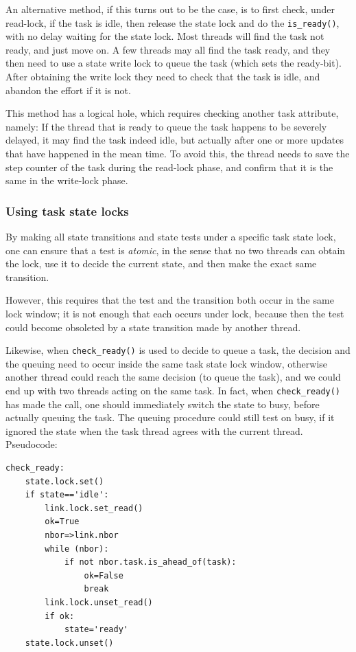 \documentclass[paper=a4,fontsize=11pt]{scrartcl}
\numberwithin{equation}{section}		%
\numberwithin{figure}{section}			%
\numberwithin{table}{section}				%
\newcommand{\codecolor}{\color{Blue}}
\newcommand{\Code}[1]{{\codecolor\texttt{#1}}}
\def\checkready{\Code{check\_ready()}}
\begin{document}
An alternative method, if this turns out to be the case, is to first check, under read-lock, if the task is idle, then release the state lock and do the \verb|is_ready()|, with no delay waiting for the state lock.  Most threads will find the task not ready, and just move on.  A few threads may all find the task ready, and they then need to use a state write lock to queue the task (which sets the ready-bit).  After obtaining the write lock they need to check that the task is idle, and abandon the effort if it is not.

This method has a logical hole, which requires checking another task attribute, namely:  If the thread that is ready to queue the task happens to be severely delayed, it may find the task indeed idle, but actually after one or more updates that have happened in the mean time.  To avoid this, the thread needs to save the step counter of the task during the read-lock phase, and confirm that it is the same in the write-lock phase.

\subsubsection{Using task state locks}
By making all state transitions and state tests under a specific task state lock, one can ensure that a test is \textit{atomic}, in the sense that no two threads can obtain the lock, use it to decide the current state, and then make the exact same transition.

However, this requires that the test and the transition both occur in the same lock window; it is not enough that each occurs under lock, because then the test could become obsoleted by a state transition made by another thread.

Likewise, when \checkready{} is used to decide to queue a task, the decision and the queuing need to occur inside the same task state lock window, otherwise another thread could reach the same decision (to queue the task), and we could end up with two threads acting on the same task.  In fact, when \checkready{} has made the call, one should immediately switch the state to busy, before actually queuing the task.  The queuing procedure could still test on busy, if it ignored the state when the task thread agrees with the current thread.  Pseudocode:
{\small\codecolor\begin{verbatim}
check_ready:
    state.lock.set()
    if state=='idle':
        link.lock.set_read()
        ok=True
        nbor=>link.nbor
        while (nbor):
            if not nbor.task.is_ahead_of(task):
                ok=False
                break
        link.lock.unset_read()
        if ok:
            state='ready'
    state.lock.unset()
\end{verbatim}}
\end{document}

